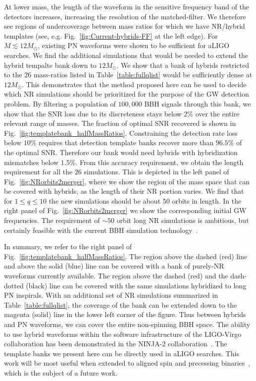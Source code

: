 \documentclass[aps,
prd,
twocolumn,
superscriptaddress,
lengthcheck,showpacs,letterpaper,nofootinbib,
floatfix]{revtex4-1}
\begin{document}
At lower mass, the length of the waveform in the sensitive frequency
band of the detectors increases, increasing the resolution of 
the matched-filter. We therefore see regions of undercoverage 
between mass ratios for which we have NR/hybrid templates 
(see, e.g. Fig.~\ref{fig:Current-hybrids-FF} at the left edge).
For $M\lesssim 12M_\odot$, existing PN waveforms were shown to 
be sufficient for aLIGO searches. 
We find the additional simulations that would be needed to extend
the hybrid tempalte bank down to $12M_\odot$. We show that a bank
of hybrids restricted to the $26$ mass-ratios listed in 
Table~\ref{table:fullqlist} would be sufficiently dense at $12M_\odot$.
This demonstrates that the method proposed here can be used 
to decide which NR simulations should be prioritized for the purpose
of the GW detection problem.
By filtering a population of $100,000$ BBH signals
through this bank, we show that the SNR loss due to its discreteness
stays below $2\%$ over the entire relevant range of masses.
The fraction of optimal SNR recovered is shown in 
Fig.~\ref{fig:templatebank_halfMassRatios}. Constraining the 
detection rate loss below $10\%$ requires that detection template 
banks recover more than $96.5\%$ of the optimal SNR. Therefore
our bank would need hybrids with hybridization mismatches below 
$1.5\%$. From this accuracy requirement, we obtain the length
requirement for all the $26$ simulations. This is depicted in the 
left panel of Fig.~\ref{fig:NRorbits2merger}, where we show the region
of the mass space that can be covered with hybrids, as the length of 
their NR portion varies. We find that for $1\leq q\leq 10$  the 
new simulations should be about $50$ orbits in length. In the right 
panel of Fig.~\ref{fig:NRorbits2merger} we show the corresponding
initial GW frequencies. The requirement of $\sim 50$ orbit long NR
simulations is ambitious, but certainly feasible with the current BBH 
simulation technology~\cite{BelaLongSimulation}.

In summary, we refer to the right panel of
Fig.~\ref{fig:templatebank_halfMassRatios}.
The region above the dashed (red) line and above the solid (blue) line can
be covered with a bank of purely-NR waveforms currently available. The region
above the dashed (red) and the dash-dotted (black) line can be covered with
the same simulations hybridized to long PN inspirals. With an additional set
of NR simulations summarized in Table~\ref{table:fullqlist}, the coverage
of the bank can be extended down to the magenta (solid) line in the lower
left corner of the figure. Thus between hybrids and PN waveforms, 
we can cover the entire non-spinning BBH space. The ability to use hybrid
waveforms within the software infrastructure of the LIGO-Virgo collaboration 
has been demonstrated in the NINJA-2 collaboration~\cite{NINJA2:2013inPrep}.
The template banks we present here can be directly used in aLIGO searches. 
This work will be most useful when extended to aligned spin and 
precessing binaries~\cite{Boyle:2013nka,Schmidt:2012rh}, which is the
subject of a future work.
\end{document}
